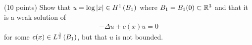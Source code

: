 (10 points)
Show that $u = \log|x| \in \sobolevh{B_1}{1}$ where $B_1 = B_1(0) \subset \reals^3$
and that it is a weak solution of
\begin{align*}
  -\Delta u + c(x) u = 0
\end{align*}
for some $c(x) \in \lnfunc{B_1}{\frac{3}{2}}$,
but that $u$ is not bounded.
